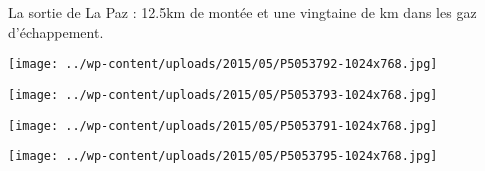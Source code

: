  La sortie de La Paz : 12.5km de montée et une vingtaine de km dans les gaz d'échappement. \newline
 \newline
\centerline{\texttt{[image: ../wp-content/uploads/2015/05/P5053792-1024x768.jpg]} } 
 \newline
 \newline
\centerline{\texttt{[image: ../wp-content/uploads/2015/05/P5053793-1024x768.jpg]} } 
 \newline
 \newline
\centerline{\texttt{[image: ../wp-content/uploads/2015/05/P5053791-1024x768.jpg]} } 
 \newline
 \newline
\centerline{\texttt{[image: ../wp-content/uploads/2015/05/P5053795-1024x768.jpg]} } 
 \newline

\newpage
 

